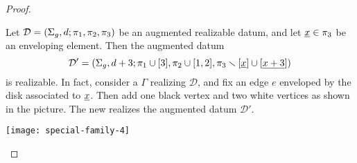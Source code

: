 \documentclass{article}
\begin{document}
\begin{proof}
\begin{manycases}
Let $\mathcal{D}=\left(\Sigma_g,d;\pi_1,\pi_2,\pi_3\right)$ be an augmented realizable datum, and let $\underline{x}\in\pi_3$ be an enveloping element. Then the augmented datum
\[
\mathcal{D}'=\left(\Sigma_g,d+3;\pi_1\cup[3],\pi_2\cup[1,2],\pi_3\smallsetminus[\underline{x}]\cup[\underline{x+3}]\right)
\]
is realizable. In fact, consider a \dessin{} $\Gamma$ realizing $\mathcal{D}$, and fix an edge $e$ enveloped by the disk associated to $\underline{x}$. Then add one black vertex and two white vertices as shown in the picture. The new \dessin{} realizes the augmented datum $\mathcal{D'}$.
\tcblower
\begin{center}
\texttt{[image: special-family-4]}
\end{center}


\end{manycases}
\end{proof}
\end{document}

